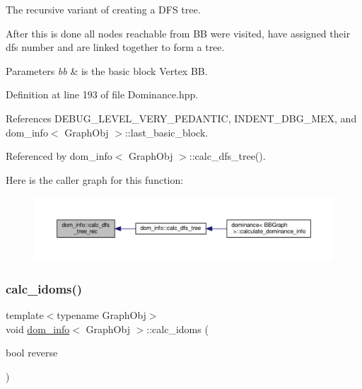 The recursive variant of creating a D\+FS tree. 

After this is done all nodes reachable from BB were visited, have assigned their dfs number and are linked together to form a tree. 
\begin{DoxyParams}{Parameters}
{\em bb} & is the basic block Vertex BB. \\
\hline
\end{DoxyParams}


Definition at line 193 of file Dominance.\+hpp.



References D\+E\+B\+U\+G\+\_\+\+L\+E\+V\+E\+L\+\_\+\+V\+E\+R\+Y\+\_\+\+P\+E\+D\+A\+N\+T\+IC, I\+N\+D\+E\+N\+T\+\_\+\+D\+B\+G\+\_\+\+M\+EX, and dom\+\_\+info$<$ Graph\+Obj $>$\+::last\+\_\+basic\+\_\+block.



Referenced by dom\+\_\+info$<$ Graph\+Obj $>$\+::calc\+\_\+dfs\+\_\+tree().

Here is the caller graph for this function\+:
\nopagebreak
\begin{figure}[H]
\begin{center}
\leavevmode
\includegraphics[width=350pt]{d3/dea/classdom__info_a18d67c729387f2e0c4f352a4f754e9a7_icgraph}
\end{center}
\end{figure}
\mbox{\label{classdom__info_a814bd35f207ecedcb14aee48eb548d32}} 
\subsubsection{\texorpdfstring{calc\+\_\+idoms()}{calc\_idoms()}}
{\footnotesize\ttfamily template$<$typename Graph\+Obj$>$ \\
void \hyperlink{classdom__info}{dom\+\_\+info}$<$ Graph\+Obj $>$\+::calc\+\_\+idoms (\begin{DoxyParamCaption}\item[{bool}]{reverse }\end{DoxyParamCaption})\hspace{0.3cm}{\ttfamily [inline]}}



